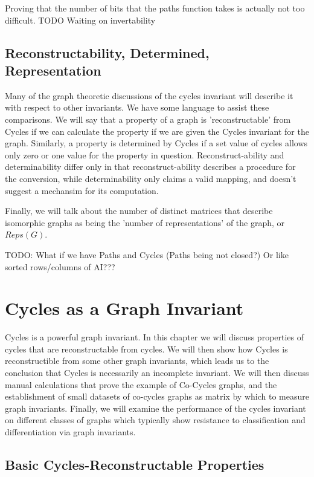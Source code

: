 \documentclass[11pt,a4paper]{report}
\begin{document}
Proving that the number of bits that the paths function takes is actually not too difficult.
TODO Waiting on invertability

\section{Reconstructability, Determined, Representation}
Many of the graph theoretic discussions of the cycles invariant will describe it with respect to other invariants. We have some language to assist these comparisons.
We will say that a property of a graph is 'reconstructable' from Cycles if we can calculate the property if we are given the Cycles invariant for the graph.
Similarly, a property is determined by Cycles if a set value of cycles allows only zero or one value for the property in question.
Reconstruct-ability and determinability differ only in that reconstruct-ability describes a procedure for the conversion, while determinability only claims a valid mapping, and doesn't suggest a mechansim for its computation.

Finally, we will talk about the number of distinct matrices that describe isomorphic graphs as being the 'number of representations' of the graph, or $Reps(G)$.

TODO: What if we have Paths and Cycles (Paths being not closed?) Or like sorted rows/columns of AI???


\chapter{Cycles as a Graph Invariant}
Cycles is a powerful graph invariant.
In this chapter we will discuss properties of cycles that are reconstructable from cycles.
We will then show how Cycles is reconstructible from some other graph invariants, which leads us to the conclusion that Cycles is necessarily an incomplete invariant.
We will then discuss manual calculations that prove the example of Co-Cycles graphs, and the establishment of small datasets of co-cycles graphs as matrix by which to measure graph invariants.
Finally, we will examine the performance of the cycles invariant on different classes of graphs which typically show resistance to classification and differentiation via graph invariants.

\section{Basic Cycles-Reconstructable Properties}
\end{document}
